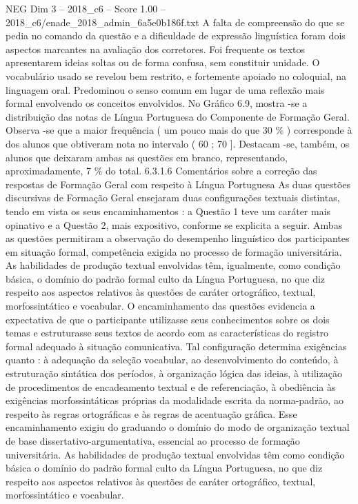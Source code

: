 \begin{textsample}{NEG Dim 3 – 2018\_c6 – Score 1.00 – 2018\_c6/enade\_2018\_admin\_6a5e0b186f.txt}
A falta de compreensão do que se pedia no comando da questão e a dificuldade de expressão linguística foram dois aspectos marcantes na avaliação dos corretores.
Foi frequente os textos apresentarem ideias soltas ou de forma confusa, sem constituir unidade.
O vocabulário usado se revelou bem restrito, e fortemente apoiado no coloquial, na linguagem oral.
Predominou o senso comum em lugar de uma reflexão mais formal envolvendo os conceitos envolvidos.
No Gráfico 6.9, mostra -se a distribuição das notas de Língua Portuguesa do Componente de Formação Geral.
Observa -se que a maior frequência ( um pouco mais do que 30 \% ) corresponde à dos alunos que obtiveram nota no intervalo ( 60 ; 70 ].
Destacam -se, também, os alunos que deixaram ambas as questões em branco, representando, aproximadamente, 7 \% do total. 6.3.1.6 Comentários sobre a correção das respostas de Formação Geral com respeito à Língua Portuguesa As duas questões discursivas de Formação Geral ensejaram duas configurações textuais distintas, tendo em vista os seus encaminhamentos : a Questão 1 teve um caráter mais opinativo e a Questão 2, mais expositivo, conforme se explicita a seguir.
Ambas as questões permitiram a observação do desempenho linguístico dos participantes em situação formal, competência exigida no processo de formação universitária.
As habilidades de produção textual envolvidas têm, igualmente, como condição básica, o domínio do padrão formal culto da Língua Portuguesa, no que diz respeito aos aspectos relativos às questões de caráter ortográfico, textual, morfossintático e vocabular.
O encaminhamento das questões evidencia a expectativa de que o participante utilizasse seus conhecimentos sobre os dois temas e estruturasse seus textos de acordo com as características do registro formal adequado à situação comunicativa.
Tal configuração determina exigências quanto : à adequação da seleção vocabular, ao desenvolvimento do conteúdo, à estruturação sintática dos períodos, à organização lógica das ideias, à utilização de procedimentos de encadeamento textual e de referenciação, à obediência às exigências morfossintáticas próprias da modalidade escrita da norma-padrão, ao respeito às regras ortográficas e às regras de acentuação gráfica.
Esse encaminhamento exigiu do graduando o domínio do modo de organização textual de base dissertativo-argumentativa, essencial ao processo de formação universitária.
As habilidades de produção textual envolvidas têm como condição básica o domínio do padrão formal culto da Língua Portuguesa, no que diz respeito aos aspectos relativos às questões de caráter ortográfico, textual, morfossintático e vocabular.

\end{textsample}
